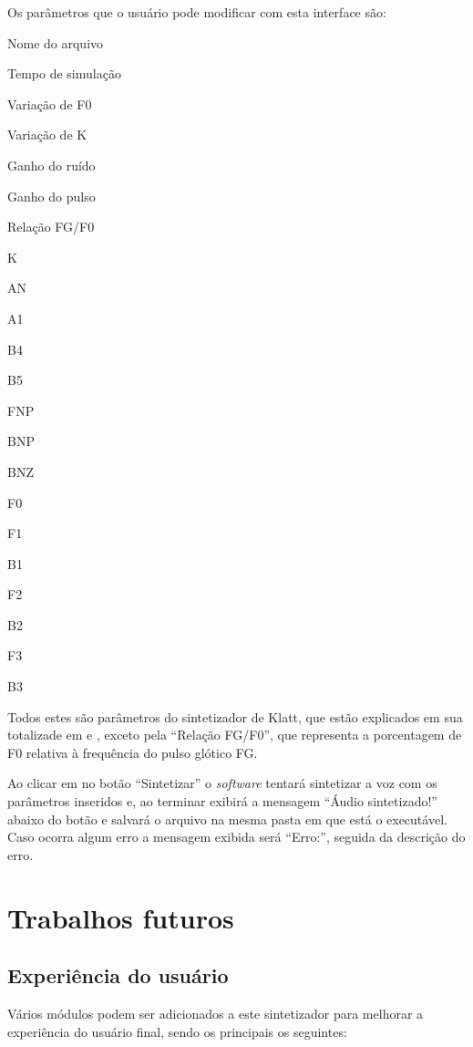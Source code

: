 \documentclass[
  12pt,       
  openright,      
  twoside,      
  a4paper,      
  english,      
  french,       
  spanish,      
  brazil,     
  ]{abntex2}
\begin{document}
Os parâmetros que o usuário pode modificar com esta interface são:
\begin{alineas}
\item Nome do arquivo
\item Tempo de simulação
\item Variação de F0
\item Variação de K
\item Ganho do ruído
\item Ganho do pulso
\item Relação FG/F0
\item K
\item AN
\item A1
\item B4
\item B5
\item FNP
\item BNP
\item BNZ
\item F0
\item F1
\item B1
\item F2
\item B2
\item F3
\item B3
\end{alineas}

Todos estes são parâmetros do sintetizador de Klatt, que estão explicados em sua totalizade em  e , exceto pela ``Relação FG/F0'', que representa a porcentagem de F0 relativa à frequência do pulso glótico FG.

Ao clicar em no botão ``Sintetizar'' o \textit{software} tentará sintetizar a voz com os parâmetros inseridos e, ao terminar exibirá a mensagem ``Áudio sintetizado!'' abaixo do botão e salvará o arquivo na mesma pasta em que está o executável. Caso ocorra algum erro a mensagem exibida será ``Erro:'', seguida da descrição do erro.

\chapter{Trabalhos futuros}
\label{sec:trabalhosfuturos}
\section{Experiência do usuário}
Vários módulos podem ser adicionados a este sintetizador para melhorar a experiência do usuário final, sendo os principais os seguintes:
\end{document}
